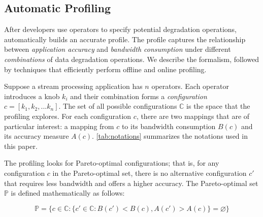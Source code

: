 \subsection{Automatic Profiling}
\label{sec:automatic-profiling}

After developers use \maybe{} operators to specify potential degradation
operations, \sysname{} automatically builds an accurate profile. The profile
captures the relationship between \textit{application accuracy} and \textit{bandwidth
consumption}
under different \textit{combinations} of data degradation operations. We describe the
formalism, followed by techniques that efficiently perform offline and online
profiling.

 Suppose a stream processing application has $n$
\maybe{} operators. Each operator introduces a knob $k_i$ and their combination
forms a \textit{configuration} $c = [k_{1}, k_{2}, ... k_{n}]$. The set of all
possible configurations $\mathbb{C}$ is the space that the profiling
explores. For each configuration $c$, there are two mappings that are of
particular interest: a mapping from $c$ to its bandwidth consumption $B(c)$ and
its accuracy measure $A(c)$. \autoref{tab:notations} summarizes the notations
used in this paper.

The profiling looks for Pareto-optimal configurations; that is, for any
configuration $c$ in the Pareto-optimal set, there is no alternative
configuration $c'$ that requires less bandwidth and offers a higher
accuracy. The Pareto-optimal set $\mathbb{P}$ is defined mathematically as
follows:

{\small \vspace{-1em}
  \begin{equation}
  \mathbb{P} = \{ c \in \mathbb{C} : \{ c' \in \mathbb{C}: B(c') < B(c),
  A(c') > A(c) \} = \varnothing\}
  \label{eq:pareto}
\end{equation}
}%

